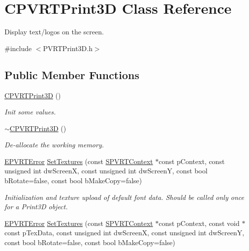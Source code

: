 \hypertarget{class_c_p_v_r_t_print3_d}{\section{C\+P\+V\+R\+T\+Print3\+D Class Reference}
\label{class_c_p_v_r_t_print3_d}
}


Display text/logos on the screen.  




{\ttfamily \#include $<$P\+V\+R\+T\+Print3\+D.\+h$>$}

\subsection*{Public Member Functions}
\begin{DoxyCompactItemize}
\item 
\hyperlink{class_c_p_v_r_t_print3_d_aa9694b85a9c2aa70daf6196ef51ad5f2}{C\+P\+V\+R\+T\+Print3\+D} ()
\begin{DoxyCompactList}\small\item\em Init some values. \end{DoxyCompactList}\item 
\hyperlink{class_c_p_v_r_t_print3_d_a8c91fd9bd8ada96c08ad6a9a463be270}{$\sim$\+C\+P\+V\+R\+T\+Print3\+D} ()
\begin{DoxyCompactList}\small\item\em De-\/allocate the working memory. \end{DoxyCompactList}\item 
\hyperlink{_p_v_r_t_error_8h_a9e837ff1a83f3a5f332bc4cc78454608}{E\+P\+V\+R\+T\+Error} \hyperlink{class_c_p_v_r_t_print3_d_a83a1fbe0a34d14a6a0d206b1e555dda7}{Set\+Textures} (const \hyperlink{struct_s_p_v_r_t_context}{S\+P\+V\+R\+T\+Context} $\ast$const p\+Context, const unsigned int dw\+Screen\+X, const unsigned int dw\+Screen\+Y, const bool b\+Rotate=false, const bool b\+Make\+Copy=false)
\begin{DoxyCompactList}\small\item\em Initialization and texture upload of default font data. Should be called only once for a Print3\+D object. \end{DoxyCompactList}\item 
\hyperlink{_p_v_r_t_error_8h_a9e837ff1a83f3a5f332bc4cc78454608}{E\+P\+V\+R\+T\+Error} \hyperlink{class_c_p_v_r_t_print3_d_addc9cde8ec3b9f0b525ca162f25559e9}{Set\+Textures} (const \hyperlink{struct_s_p_v_r_t_context}{S\+P\+V\+R\+T\+Context} $\ast$const p\+Context, const void $\ast$const p\+Tex\+Data, const unsigned int dw\+Screen\+X, const unsigned int dw\+Screen\+Y, const bool b\+Rotate=false, const bool b\+Make\+Copy=false)

\end{DoxyCompactItemize}
